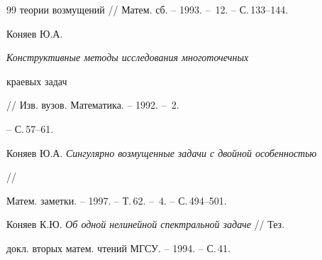 \begin{thebibliography}{99}
{теории возмущений} // Матем. сб. -- 1993. -- \No\,12. -- С.\,133--144. 




Коняев Ю.А. {\em Конструктивные методы исследования многоточечных 


краевых задач} // Изв. вузов. Математика. -- 1992. -- \No\,2. 


-- С.\,57--61. 




Коняев Ю.А. {\em Сингулярно возмущенные задачи с двойной особенностью} 


// 


Матем. заметки. -- 1997. -- Т.\,62. -- \No\,4. -- С.\,494--501. 




Коняев К.Ю. {\em Об одной нелинейной спектральной задаче} // Тез. 


докл. вторых матем. чтений МГСУ. -- 1994. -- С.\,41. 


 


\end{thebibliography} 


 


\vskip 2cm 


 








\label{end} 


 


